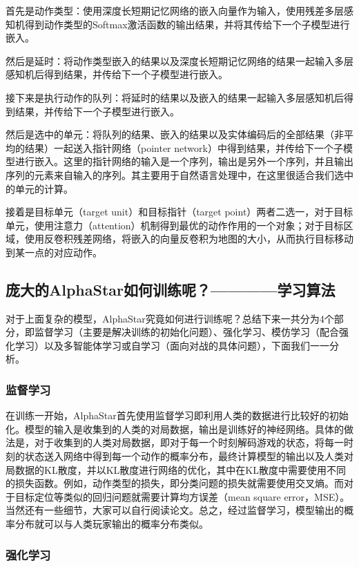 首先是动作类型：使用深度长短期记忆网络的嵌入向量作为输入，使用残差多层感知机得到动作类型的Softmax激活函数的输出结果，并将其传给下一个子模型进行嵌入。

然后是延时：将动作类型嵌入的结果以及深度长短期记忆网络的结果一起输入多层感知机后得到结果，并传给下一个子模型进行嵌入。

接下来是执行动作的队列：将延时的结果以及嵌入的结果一起输入多层感知机后得到结果，并传给下一个子模型进行嵌入。

然后是选中的单元：将队列的结果、嵌入的结果以及实体编码后的全部结果（非平均的结果）一起送入指针网络（pointer network）中得到结果，并传给下一个子模型进行嵌入。这里的指针网络的输入是一个序列，输出是另外一个序列，并且输出序列的元素来自输入的序列。其主要用于自然语言处理中，在这里很适合我们选中的单元的计算。

接着是目标单元（target unit）和目标指针（target point）两者二选一，对于目标单元，使用注意力（attention）机制得到最优的动作作用的一个对象；对于目标区域，使用反卷积残差网络，将嵌入的向量反卷积为地图的大小，从而执行目标移动到某一点的对应动作。

\subsection{庞大的AlphaStar如何训练呢？————学习算法} 

对于上面复杂的模型，AlphaStar究竟如何进行训练呢？总结下来一共分为4个部分，即监督学习（主要是解决训练的初始化问题）、强化学习、模仿学习（配合强化学习）以及多智能体学习或自学习（面向对战的具体问题），下面我们一一分析。

\subsubsection{监督学习}

在训练一开始，AlphaStar首先使用监督学习即利用人类的数据进行比较好的初始化。模型的输入是收集到的人类的对局数据，输出是训练好的神经网络。具体的做法是，对于收集到的人类对局数据，即对于每一个时刻解码游戏的状态，将每一时刻的状态送入网络中得到每一个动作的概率分布，最终计算模型的输出以及人类对局数据的KL散度，并以KL散度进行网络的优化，其中在KL散度中需要使用不同的损失函数。例如，动作类型的损失，即分类问题的损失就需要使用交叉熵。而对于目标定位等类似的回归问题就需要计算均方误差（mean square error，MSE）。当然还有一些细节，大家可以自行阅读论文。总之，经过监督学习，模型输出的概率分布就可以与人类玩家输出的概率分布类似。

\subsubsection{强化学习} 

